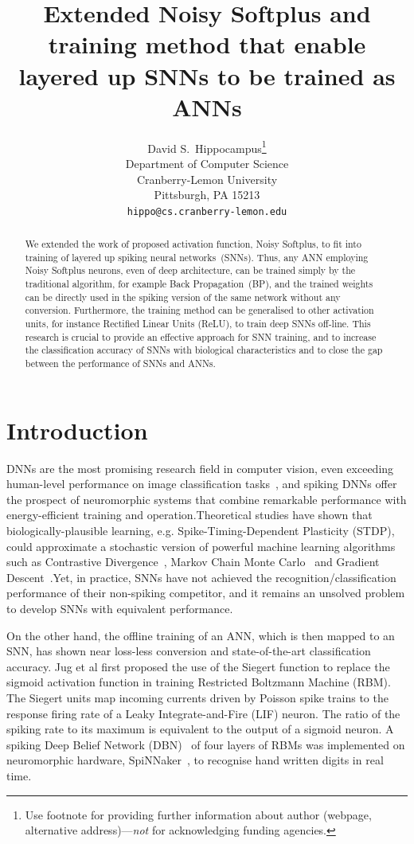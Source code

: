 \documentclass{article}
\title{ Extended Noisy Softplus and training method that enable layered up SNNs  to  be  trained as ANNs}
\author{
  David S.~Hippocampus\thanks{Use footnote for providing further
    information about author (webpage, alternative
    address)---\emph{not} for acknowledging funding agencies.} \\
  Department of Computer Science\\
  Cranberry-Lemon University\\
  Pittsburgh, PA 15213 \\
  \texttt{hippo@cs.cranberry-lemon.edu} \\
}
\begin{document}

\maketitle

\begin{abstract}
  We extended the work of proposed activation function, Noisy Softplus, to fit into training of layered up spiking neural networks~(SNNs).
  Thus, any ANN employing Noisy Softplus neurons, even of deep architecture, can be trained simply by the traditional algorithm, for example Back Propagation~(BP), and the trained weights can be directly used in the spiking version of the same network without any conversion.
  Furthermore, the training method can be generalised to other activation units, for instance Rectified Linear Units (ReLU), to train deep SNNs off-line.
  This research is crucial to provide an effective approach for SNN training, and to increase the classification accuracy of SNNs with biological characteristics and to close the gap between the performance of SNNs and ANNs.
 
\end{abstract}

\section{Introduction}
DNNs are the most promising research field in computer vision, even exceeding human-level performance on image classification tasks~\cite{he2015delving}, and spiking DNNs offer the prospect of neuromorphic systems that combine remarkable performance with energy-efficient training and operation.Theoretical studies have shown that biologically-plausible learning, e.g. Spike-Timing-Dependent Plasticity (STDP), could approximate a stochastic version of powerful machine learning algorithms such as 
Contrastive Divergence~\cite{neftci2013event}, Markov Chain Monte Carlo~\cite{buesing2011neural} and Gradient Descent~\cite{o2016deep}.Yet, in practice, SNNs have not achieved the recognition/classification performance of their non-spiking competitor, and it remains an unsolved problem to develop SNNs with equivalent performance.


On the  other  hand, the offline training of an ANN, which is then mapped to an SNN, has shown near loss-less conversion and state-of-the-art classification accuracy.
Jug et al\cite{Jug_etal_2012} first proposed the use of the Siegert function to replace the sigmoid activation function in training Restricted Boltzmann Machine (RBM).
The Siegert units map incoming currents driven by Poisson spike trains to the response firing rate of a Leaky Integrate-and-Fire (LIF) neuron.
The ratio of the spiking rate to its maximum is equivalent to the output of a sigmoid neuron.
A spiking Deep Belief Network (DBN)~\cite{Stromatias2015scalable} of four layers of RBMs was implemented on neuromorphic hardware, SpiNNaker~\cite{furber2014spinnaker}, to recognise hand written digits in real time.
\end{document}

